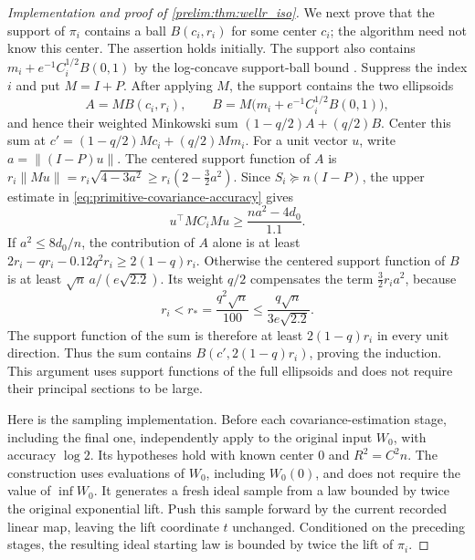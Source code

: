 \documentclass[11pt]{article}
\numberwithin{equation}{section}
\theoremstyle{definition}
\begin{document}
\begin{proof}[Implementation and proof of \cref{prelim:thm:wellr_iso}]
We next prove that the support of $\pi_i$ contains a ball $B(c_i,r_i)$
for some center $c_i$; the algorithm need not know this center.
The assertion holds initially.
The support also contains
$m_i+e^{-1}C_i^{1/2}B(0,1)$ by the log-concave support-ball bound
\cite[Lemma~A.10]{KV25}.
Suppress the index $i$ and put $M=I+P$.
After applying $M$, the support contains the two ellipsoids
\[
 A=M B(c_i,r_i),\qquad
 B=M\bigl(m_i+e^{-1}C_i^{1/2}B(0,1)\bigr),
\]
and hence their weighted Minkowski sum $(1-q/2)A+(q/2)B$.
Center this sum at
$c'=(1-q/2)Mc_i+(q/2)Mm_i$.
For a unit vector $u$, write $a=\|(I-P)u\|$.
The centered support function of $A$ is
$r_i\|Mu\|=r_i\sqrt{4-3a^2}\geq r_i(2-\tfrac32a^2)$.
Since $S_i\succeq n(I-P)$, the upper estimate in
\eqref{eq:primitive-covariance-accuracy} gives
\[
 u^\top MC_iMu\geq\frac{na^2-4d_0}{1.1}.
\]
If $a^2\leq8d_0/n$, the contribution of $A$ alone is at least
$2r_i-qr_i-0.12q^2r_i\geq2(1-q)r_i$.
Otherwise the centered support function of $B$ is at least
$\sqrt n\,a/(e\sqrt{2.2})$.
Its weight $q/2$ compensates the term $\tfrac32r_i a^2$, because
\[
 r_i<r_*=\frac{q^2\sqrt n}{100}
 \leq\frac{q\sqrt n}{3e\sqrt{2.2}}.
\]
The support function of the sum is therefore at least
$2(1-q)r_i$ in every unit direction.
Thus the sum contains $B(c',2(1-q)r_i)$, proving the induction.
This argument uses support functions of the full ellipsoids and does not
require their principal sections to be large.

Here is the sampling implementation.
Before each covariance-estimation stage, including the final one, independently
apply \cite[Theorem~3.16]{KV25} to the original input $W_0$, with accuracy
$\log2$.
Its hypotheses hold with known center $0$ and $R^2=C^2n$.
The construction uses evaluations of $W_0$, including $W_0(0)$, and does
not require the value of $\inf W_0$.
It generates a fresh ideal sample from a law bounded by twice the original
exponential lift.
Push this sample forward by the current recorded linear map, leaving the
lift coordinate $t$ unchanged.
Conditioned on the preceding stages, the resulting ideal starting law is
bounded by twice the lift of $\pi_i$.


\end{proof}
\end{document}
